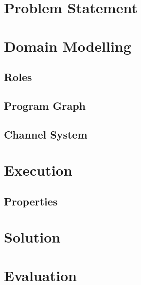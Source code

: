 \section {Problem Statement}
\label{sec:problem}


\section{Domain Modelling}
\label{sec:modelling}


\subsection{Roles}
\label{sec:roles}


\subsection{Program Graph}
\label{sec:pg}


\subsection{Channel System}
\label{sec:cs}


\section{Execution}
\label{sec:execution}


\subsection{Properties}
\label{sec:properties}


\section{Solution}
\label{sec:solution}



%


\section{Evaluation}%
\label{sec:validation}



%

